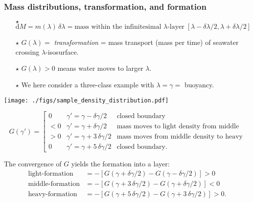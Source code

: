 \documentclass[10pt]{beamer}
\begin{document}
\begin{frame}
  \frametitle{Mass distributions, transformation, and formation}
\scriptsize 

\begin{exampleblock}{}
\begin{itemize}
\item[$\star$]
  $\mathrm{d} M = m(\lambda) \, \delta \lambda = \mbox{mass within the
    infinitesimal $\lambda$-layer} \; [\lambda - \delta \lambda/2,
  \lambda + \delta \lambda/2]$
\item[$\star$]  $G(\lambda) = $ {\it transformation} = mass transport
 (mass per time) of seawater crossing $\lambda$-isosurface.
\item[$\star$]  $G(\lambda) > 0$ means water moves to larger $\lambda$.  
\item[$\star$] We here consider a three-class example with $\lambda = \gamma = $ buoyancy.
\end{itemize}
\end{exampleblock}

\begin{center}
{\texttt{[image: ./figs/sample\_density\_distribution.pdf]}}
\end{center}

\begin{equation*}
   G(\gamma') = 
    \left[
    \begin{array}{lll}
     0     &\gamma' = \gamma - \delta\gamma/2  &\mbox{closed boundary} \\
     <0   &\gamma' = \gamma + \delta\gamma/2  &\mbox{mass moves to light density from middle}\\
     >0   &\gamma' = \gamma + 3 \, \delta\gamma/2  &\mbox{mass moves from middle density to heavy}\\
     0     &\gamma' = \gamma + 5\, \delta\gamma/2  &\mbox{closed boundary.} 
    \end{array}
    \right.
\end{equation*}

The convergence of $G$ yields the formation into a layer: 
\begin{align*}
  \mbox{light-formation}  &= -[G(\gamma + \delta\gamma/2) - G(\gamma - \delta\gamma/2)] > 0 
\\
  \mbox{middle-formation} &= -[G(\gamma  + 3 \, \delta\gamma/2) - G(\gamma + \delta\gamma/2)]  < 0 
\\
  \mbox{heavy-formation}  &= -[G(\gamma  + 5 \, \delta\gamma/2) - G(\gamma + 3 \, \delta\gamma/2)] > 0.  
\end{align*}


\end{frame}
\end{document}

